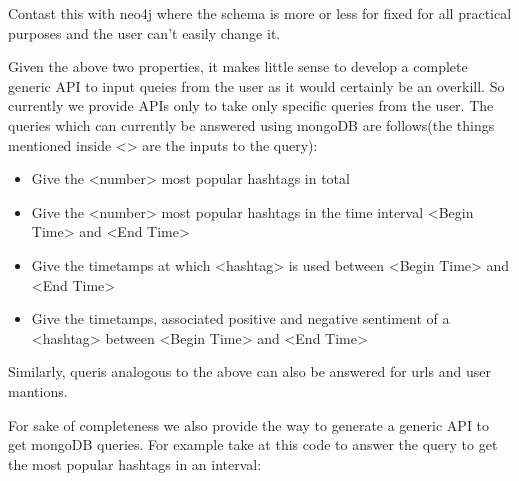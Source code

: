 \documentclass[letterpaper,10pt,english]{sphinxmanual}
\begin{document}
Contast this with neo4j where the schema is more or less for fixed for all practical purposes and the user can’t easily change it.

Given the above two properties, it makes little sense to develop a complete generic API to input queies from the user as it would certainly be an overkill. So currently we provide APIs only to take only specific queries from the user. The queries which can currently be answered using mongoDB are follows(the things mentioned inside \textless{}\textgreater{} are the inputs to the query):
\begin{itemize}
\item {} 
Give the \textless{}number\textgreater{} most popular hashtags in total

\item {} 
Give the \textless{}number\textgreater{} most popular hashtags in the time interval \textless{}Begin Time\textgreater{} and \textless{}End Time\textgreater{}

\item {} 
Give the timetamps at which \textless{}hashtag\textgreater{} is used between \textless{}Begin Time\textgreater{} and \textless{}End Time\textgreater{}

\item {} 
Give the timetamps, associated positive and negative sentiment of a \textless{}hashtag\textgreater{} between \textless{}Begin Time\textgreater{} and \textless{}End Time\textgreater{}

\end{itemize}

Similarly, queris analogous to the above can also be answered for urls and user mantions.

For sake of completeness we also provide the way to generate a generic API to get mongoDB queries. For example take at this code to answer the query to get the most popular hashtags in an interval:
\end{document}
